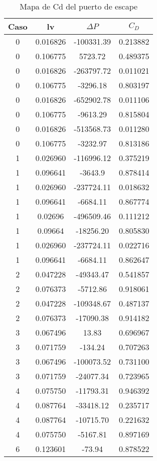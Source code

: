 \begin{table}
  \centering
    \begin{tabular}{cccc} \toprule
      Caso  & lv        & $\Delta P$    & $C_{D}$   \\ \midrule
      0     & 0.016826  & -100331.39    &  0.213882 \\
      0     & 0.106775  & 5723.72       &  0.489375 \\
      0     & 0.016826  & -263797.72    &  0.011021 \\
      0     & 0.106775  & -3296.18      &  0.803197 \\
      0     & 0.016826  & -652902.78    &  0.011106 \\
      0     & 0.106775  & -9613.29      &  0.815804 \\
      0     & 0.016826  & -513568.73    &  0.011280 \\
      0     & 0.106775  & -3232.97      &  0.813186 \\
      1     & 0.026960  & -116996.12    &  0.375219 \\
      1     & 0.096641  & -3643.9       &  0.878414 \\
      1     & 0.026960  & -237724.11    &  0.018632 \\
      1     & 0.096641  & -6684.11      &  0.867774 \\
      1     &  0.02696  & -496509.46    &  0.111212 \\
      1     &  0.09664  & -18256.20     &  0.805830 \\
      1     & 0.026960  & -237724.11    &  0.022716 \\
      1     & 0.096641  & -6684.11      &  0.862647 \\
      2     & 0.047228  & -49343.47     &  0.541857 \\
      2     & 0.076373  & -5712.86      &  0.918061 \\
      2     & 0.047228  & -109348.67    &  0.487137 \\
      2     & 0.076373  & -17090.38     &  0.914182 \\
      3     & 0.067496  & 13.83         &  0.696967 \\
      3     & 0.071759  & -134.24       &  0.707263 \\
      3     & 0.067496  & -100073.52    &  0.731100 \\
      3     & 0.071759  & -24077.34     &  0.723965 \\
      4     & 0.075750  & -11793.31     &  0.946392 \\
      4     & 0.087764  & -33418.12     &  0.235717 \\
      4     & 0.087764  & -10715.70     &  0.221632 \\
      4     & 0.075750  & -5167.81      &  0.897169 \\
      6     & 0.123601  & -73.94        &  0.878522 \\ \bottomrule
    \end{tabular}
  \caption{Mapa de Cd del puerto de escape} \label{tab:mapa_cd_escape}
\end{table}

